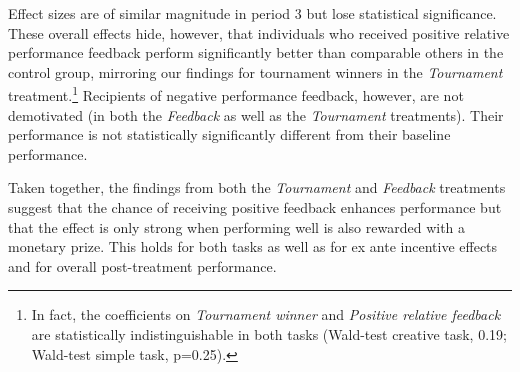 Effect sizes are of similar magnitude in period 3 but lose statistical significance. These overall effects hide, however, that 
individuals who received positive relative 
performance feedback perform significantly better than comparable others in the control group, 
mirroring our findings for tournament winners in the \textit{Tournament} treatment.\footnote{In fact, the coefficients on \textit{Tournament winner} and
\textit{Positive relative feedback} are statistically indistinguishable in both tasks (Wald-test creative task, 0.19; Wald-test simple task, p=0.25).} 
Recipients of negative performance feedback, however, are not demotivated (in both the \textit{Feedback} as 
well as the \textit{Tournament} treatments). Their performance 
is  not statistically significantly different from their baseline performance. 


Taken together, the findings from both the \textit{Tournament} and \textit{Feedback} treatments 
suggest that the chance of receiving positive feedback enhances performance 
but that the effect is only strong when performing well is also rewarded with a monetary prize.
This holds for both tasks as well as for ex ante incentive effects and for overall post-treatment performance. 






